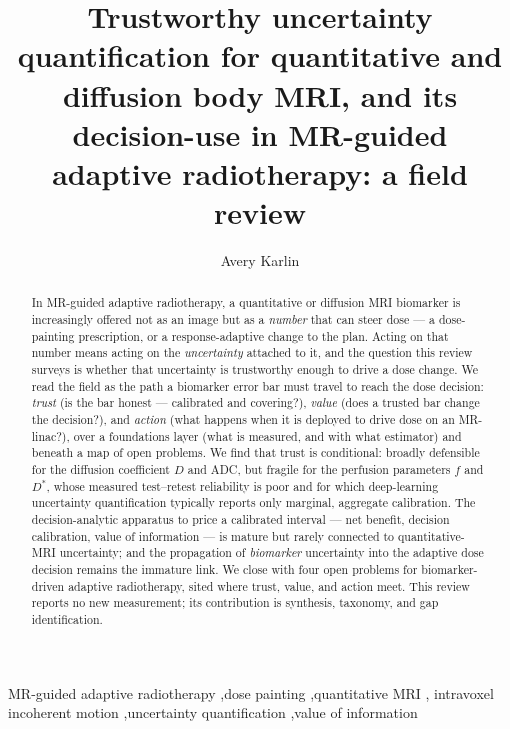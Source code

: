 \documentclass[review,number]{elsarticle}
\newcommand{\Dstar}{D^{*}}
\begin{document}
\begin{frontmatter}

\title{Trustworthy uncertainty quantification for quantitative and diffusion body MRI,
and its decision-use in MR-guided adaptive radiotherapy: a field review}

\author[col,cub,asi]{Avery Karlin}


\begin{abstract}
In MR-guided adaptive radiotherapy, a quantitative or diffusion MRI biomarker is
increasingly offered not as an image but as a \emph{number} that can steer dose --- a
dose-painting prescription, or a response-adaptive change to the plan. Acting on that
number means acting on the \emph{uncertainty} attached to it, and the question this
review surveys is whether that uncertainty is trustworthy enough to drive a dose change.
We read the field as the path a biomarker error bar must travel to reach the dose
decision: \emph{trust} (is the bar honest --- calibrated and covering?), \emph{value}
(does a trusted bar change the decision?), and \emph{action} (what happens when it is
deployed to drive dose on an MR-linac?), over a foundations layer (what is measured, and
with what estimator) and beneath a map of open problems. We find that trust is
conditional: broadly defensible for the diffusion coefficient $D$ and ADC, but fragile
for the perfusion parameters $f$ and $\Dstar$, whose measured test--retest reliability is
poor and for which deep-learning uncertainty quantification typically reports only
marginal, aggregate calibration. The decision-analytic apparatus to price a calibrated
interval --- net benefit, decision calibration, value of information --- is mature but
rarely connected to quantitative-MRI uncertainty; and the propagation of \emph{biomarker}
uncertainty into the adaptive dose decision remains the immature link. We close with four
open problems for biomarker-driven adaptive radiotherapy, sited where trust, value, and
action meet. This review reports no new measurement; its contribution is synthesis,
taxonomy, and gap identification.
\end{abstract}

\begin{keyword}
MR-guided adaptive radiotherapy \sep dose painting \sep quantitative MRI \sep
intravoxel incoherent motion \sep uncertainty quantification \sep value of information
\end{keyword}

\end{frontmatter}
\end{document}
